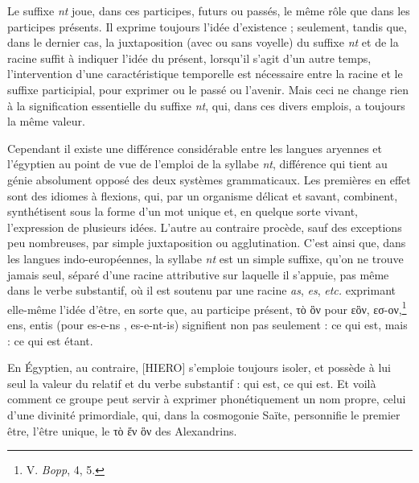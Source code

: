 \documentclass[a4paper, 11pt, oneside]{article}
\begin{document}
Le suffixe \emph{nt} joue, dans ces participes, futurs ou passés, le même rôle que dans les participes présents. Il exprime toujours l'idée d'existence ; seulement, tandis que, dans le dernier cas, la juxtaposition (avec ou sans voyelle) du suffixe \emph{nt} et de la racine suffit à indiquer l'idée du présent, lorsqu'il s'agit d'un autre temps, l'intervention d'une caractéristique temporelle est nécessaire entre la racine et le suffixe participial, pour exprimer ou le passé ou l'avenir. Mais ceci ne change rien à la signification essentielle du suffixe \emph{nt}, qui, dans ces divers emplois, a toujours la même valeur.

Cependant il existe une différence considérable entre les langues aryennes et l'égyptien au point de vue de l'emploi de la syllabe \emph{nt}, différence qui tient au génie absolument opposé des deux systèmes grammaticaux. Les premières en effet sont des idiomes à flexions, qui, par un organisme délicat et savant, combinent, synthétisent sous la forme d'un mot unique et, en quelque sorte vivant, l'expression de plusieurs idées. L'autre au contraire procède, sauf des exceptions peu nombreuses, par simple juxtaposition ou agglutination. C'est ainsi que, dans les langues indo-européennes, la syllabe \emph{nt} est un simple suffixe, qu'on ne trouve jamais seul, séparé d'une racine attributive sur laquelle il s'appuie, pas même dans le verbe substantif, où il est soutenu par une racine \emph{as}, \emph{es}, \emph{etc.} exprimant elle-même l'idée d'être, en sorte que, au participe présent, τὸ ὃν pour εὃν, εσ-ον,\footnote{V. \emph{Bopp}, 4, 5.} ens, entis (pour es-e-ns , es-e-nt-is) signifient non pas seulement : ce qui est, mais : ce qui est étant.

En Égyptien, au contraire, [HIERO] s'emploie toujours isoler, et possède à lui seul la valeur du relatif et du verbe substantif : qui est, ce qui est. Et voilà comment ce groupe peut servir à exprimer phonétiquement un nom propre, celui d'une divinité primordiale, qui, dans la cosmogonie Saïte, personnifie le premier être, l'être unique, le τὸ ἕν ὃν des Alexandrins.
\end{document}
